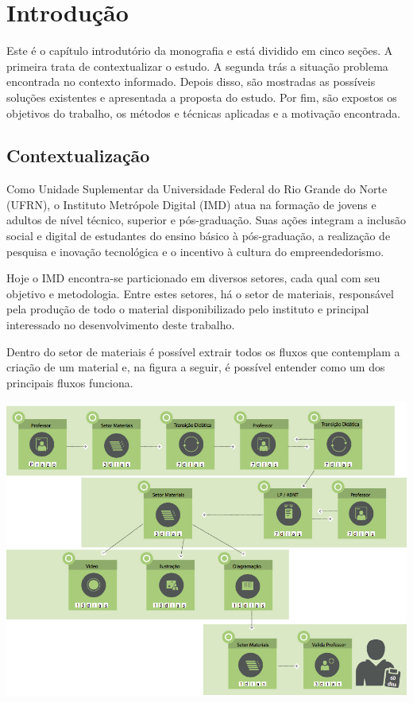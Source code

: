 \chapter{Introdução}

Este é o capítulo introdutório da monografia e está dividido em cinco seções. A primeira trata de contextualizar o estudo. A segunda trás a situação problema encontrada no contexto informado. Depois disso, são mostradas as possíveis soluções existentes e apresentada a proposta do estudo. Por fim, são expostos os objetivos do trabalho, os métodos e técnicas aplicadas e a motivação encontrada.

\section{Contextualização}

Como Unidade Suplementar da Universidade Federal do Rio Grande do Norte (UFRN), o Instituto Metrópole Digital (IMD) atua na formação de jovens e adultos de nível técnico, superior e pós-graduação. Suas ações integram a inclusão social e digital de estudantes do ensino básico à pós-graduação, a realização de pesquisa e inovação tecnológica e o incentivo à cultura do empreendedorismo.

Hoje o IMD encontra-se particionado em diversos setores, cada qual com seu objetivo e metodologia. Entre estes setores, há o setor de materiais, responsável pela produção de todo o material disponibilizado pelo instituto e principal interessado no desenvolvimento deste trabalho. 

Dentro do setor de materiais é possível extrair todos os fluxos que contemplam a criação de um material e, na figura a seguir, é possível entender como um dos principais fluxos funciona. \\

\vspace{5mm}
\begin{minipage}[c]{\textwidth}
    \includegraphics[width=14cm]{Imagens/FluxoMateriaisNovos.jpg}
    \label{fig:fluxo_materiais_novos}
\end{minipage}
\vspace{5mm}

